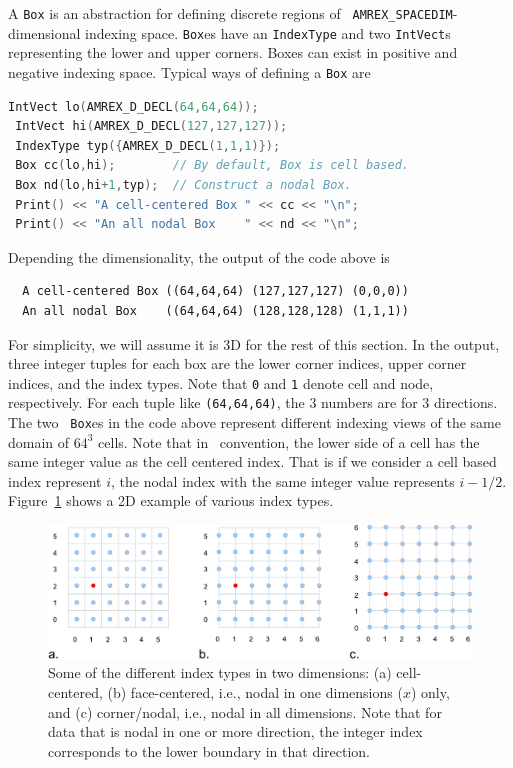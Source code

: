 {A {\tt Box} is an abstraction for defining discrete regions of {\tt
  AMREX\_SPACEDIM}-dimensional indexing space.  {\tt Box}es have an
{\tt IndexType} and two {\tt IntVect}s representing the lower and
upper corners.  Boxes can exist in positive and negative indexing
space.   Typical ways of defining a {\tt Box} are
\begin{lstlisting}[language=cpp]
 IntVect lo(AMREX_D_DECL(64,64,64));
 IntVect hi(AMREX_D_DECL(127,127,127));
 IndexType typ({AMREX_D_DECL(1,1,1)});
 Box cc(lo,hi);        // By default, Box is cell based.
 Box nd(lo,hi+1,typ);  // Construct a nodal Box.
 Print() << "A cell-centered Box " << cc << "\n";
 Print() << "An all nodal Box    " << nd << "\n";
\end{lstlisting}
Depending the dimensionality, the output of the code above is
\begin{verbatim}
  A cell-centered Box ((64,64,64) (127,127,127) (0,0,0))
  An all nodal Box    ((64,64,64) (128,128,128) (1,1,1))
\end{verbatim}
For simplicity, we will assume it is 3D for the rest of this section.
In the output, three integer tuples for each box are the lower corner
indices, upper corner indices, and the index types.  Note that {\tt 0}
and {\tt 1} denote cell and node, respectively.  For each tuple like
{\tt (64,64,64)}, the 3 numbers are for 3 directions.  The two {\tt
  Box}es in the code above represent different indexing views of the
same domain of $64^3$ cells.  Note that in \amrex\ convention, the
lower side of a cell has the same integer value as the cell centered
index.  That is if we consider a cell based index represent $i$, the
nodal index with the same integer value represents $i-1/2$.
Figure~\ref{fig:basics:indextypes} shows a 2D example of various index
types.  

\begin{figure}
  \centering
  \includegraphics[width=5in]{./Basics/indextypes.pdf}
  \caption{\label{fig:basics:indextypes} Some of the different index
    types in two dimensions: (a) cell-centered, (b) face-centered,
    i.e., nodal in one dimensions ($x$) only, and (c) corner/nodal,
    i.e., nodal in all dimensions.  Note that for data that is nodal
    in one or more direction, the integer index corresponds to the
    lower boundary in that direction.}
\end{figure}

}
